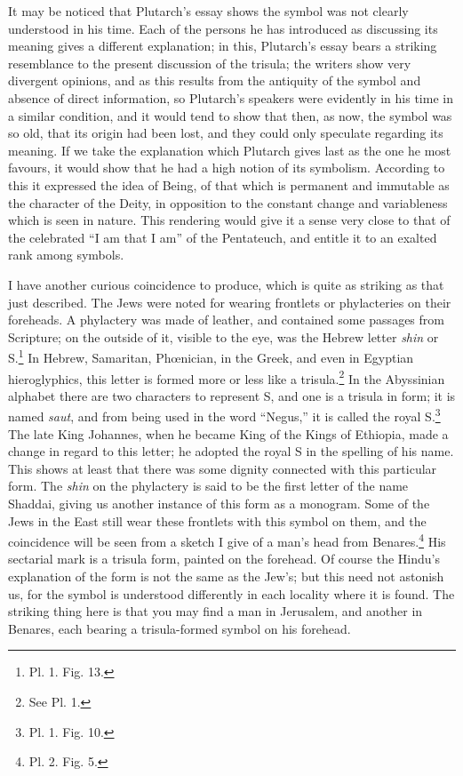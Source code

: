 \documentclass[a4paper, 11pt, oneside, english, landscape, twocolumn]{article}
\begin{document}
It may be noticed that Plutarch's essay shows the symbol was not clearly understood in his time. Each of the persons he has introduced as discussing its meaning gives a different explanation; in this, Plutarch's essay bears a striking resemblance to the present discussion of the trisula; the writers show very divergent opinions, and as this results from the antiquity of the symbol and absence of direct information, so Plutarch's speakers were evidently in his time in a similar condition, and it would tend to show that then, as now, the symbol was so old, that its origin had been lost, and they could only speculate regarding its meaning. If we take the explanation which Plutarch gives last as the one he most favours, it would show that he had a high notion of its symbolism. According to this it expressed the idea of Being, of that which is permanent and immutable as the character of the Deity, in opposition to the constant change and variableness which is seen in nature. This rendering would give it a sense very close to that of the celebrated ``I am that I am'' of the Pentateuch, and entitle it to an exalted rank among symbols.

I have another curious coincidence to produce, which is quite as striking as that just described. The Jews were noted for wearing frontlets or phylacteries on their foreheads. A phylactery was made of leather, and contained some passages from Scripture; on the outside of it, visible to the eye, was the Hebrew letter \emph{shin} or S.\footnote{Pl. 1. Fig. 13.} In Hebrew, Samaritan, Phœnician, in the Greek, and even in Egyptian hieroglyphics, this letter is formed more or less like a trisula.\footnote{See Pl. 1.} In the Abyssinian alphabet there are two characters to represent S, and one is a trisula in form; it is named \emph{saut}, and from being used in the word ``Negus,'' it is called the royal S.\footnote{Pl. 1. Fig. 10.} The late King Johannes, when he became King of the Kings of Ethiopia, made a change in regard to this letter; he adopted the royal S in the spelling of his name. This shows at least that there was some dignity connected with this particular form. The \emph{shin} on the phylactery is said to be the first letter of the name Shaddai, giving us another instance of this form as a monogram. Some of the Jews in the East still wear these frontlets with this symbol on them, and the coincidence will be seen from a sketch I give of a man's head from Benares.\footnote{Pl. 2. Fig. 5.} His sectarial mark is a trisula form, painted on the forehead. Of course the Hindu's explanation of the form is not the same as the Jew's; but this need not astonish us, for the symbol is understood differently in each locality where it is found. The striking thing here is that you may find a man in Jerusalem, and another in Benares, each bearing a trisula-formed symbol on his forehead.
\end{document}
